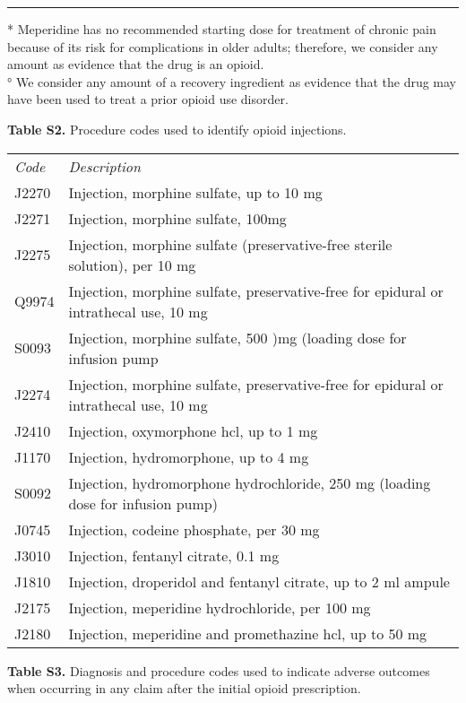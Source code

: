 \documentclass[9pt,twoside,lineno]{pnas-new}
\begin{document}
\hrule

\footnotesize
* Meperidine has no recommended starting dose for treatment of chronic pain because of its risk for complications in older adults; therefore, we consider any amount as evidence that the drug is an opioid. \\
° We consider any amount of a recovery ingredient as evidence that the drug may have been used to treat a prior opioid use disorder.
\normalsize

\newpage

\textbf{Table S2.} Procedure codes used to identify opioid injections.

\begin{tabular}{ll}
\em Code & \em Description \\[0.5em]
J2270 & Injection, morphine sulfate, up to 10 mg \\
J2271 & Injection, morphine sulfate, 100mg \\
J2275 & Injection, morphine sulfate (preservative-free sterile solution), per 10 mg \\
Q9974 & Injection, morphine sulfate, preservative-free for epidural or intrathecal use, 10 mg \\
S0093 & Injection, morphine sulfate, 500 )mg (loading dose for infusion pump \\
J2274 & Injection, morphine sulfate, preservative-free for epidural or intrathecal use, 10 mg \\
J2410 & Injection, oxymorphone hcl, up to 1 mg \\
J1170 & Injection, hydromorphone, up to 4 mg \\
S0092 & Injection, hydromorphone hydrochloride, 250 mg (loading dose for infusion pump) \\
J0745 & Injection, codeine phosphate, per 30 mg \\
J3010 & Injection, fentanyl citrate, 0.1 mg \\
J1810 & Injection, droperidol and fentanyl citrate, up to 2 ml ampule \\
J2175 & Injection, meperidine hydrochloride, per 100 mg \\
J2180 & Injection, meperidine and promethazine hcl, up to 50 mg
\end{tabular}

\newpage

\textbf{Table S3.} Diagnosis and procedure codes used to indicate adverse outcomes when occurring in any claim after the initial opioid prescription.
\end{document}
